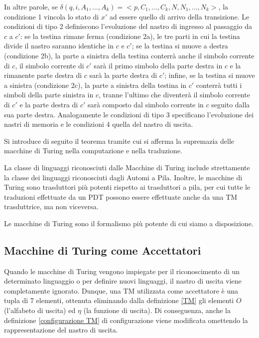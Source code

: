   In altre parole, se \(\delta(q,i,A_1,...,A_k)=<p,C_1,...,C_k,N,N_1,...,N_k>\), la condizione 1 vincola lo stato di \(x'\) ad essere quello di arrivo della transizione. Le condizioni di tipo 2 definiscono l'evoluzione del nastro di ingresso al passaggio da \(c\) a \(c'\): se la testina rimane ferma (condizione 2a), le tre parti in cui la testina divide il nastro saranno identiche in \(c\) e \(c'\); se la testina si muove a destra (condizione 2b), la parte a sinistra della testina conterrà anche il simbolo corrente di \(c\), il simbolo corrente di \(c'\) sarà il primo simbolo della parte destra in \(c\) e la rimanente parte destra di \(c\) sarà la parte destra di \(c'\); infine, se la testina si muove a sinistra (condizione 2c), la parte a sinistra della testina in \(c'\) conterrà tutti i simboli della parte sinistra in \(c\), tranne l'ultimo che diventerà il simbolo corrente di \(c'\) e la parte destra di \(c'\) sarà composto dal simbolo corrente in \(c\) seguito dalla sua parte destra. Analogamente le condizioni di tipo 3 specificano l'evoluzione dei nastri di memoria e le condizioni 4 quella del nastro di uscita.

  Si introduce di seguito il teorema tramite cui si afferma la supremazia delle macchine di Turing nella computazione e nella traduzione.

  \begin{theorem}
    La classe di linguaggi riconosciuti dalle Macchine di Turing include strettamente la classe dei linguaggi riconosciuti dagli Automi a Pila.
    Inoltre, le macchine di Turing sono trasduttori più potenti rispetto ai trasduttori a pila, per cui tutte le traduzioni effettuate da un PDT possono essere effettuate anche da una TM trasduttrice, ma non viceversa.
  \end{theorem}
  
  \noindent
  Le macchine di Turing sono il formalismo più potente di cui siamo a disposizione.

  \subsection{Macchine di Turing come Accettatori}
  Quando le macchine di Turing vengono impiegate per il riconoscimento di un determinato linguaggio o per definire nuovi linguaggi, il nastro di uscita viene completamente ignorato. Dunque, una TM utilizzata come accettatore è una tupla di 7 elementi, ottenuta eliminando dalla definizione \ref{TM} gli elementi \(O\) (l'alfabeto di uscita) ed \(\eta\) (la funzione di uscita). Di conseguenza, anche la definizione \ref{configurazione TM} di configurazione viene modificata omettendo la rappresentazione del nastro di uscita.

